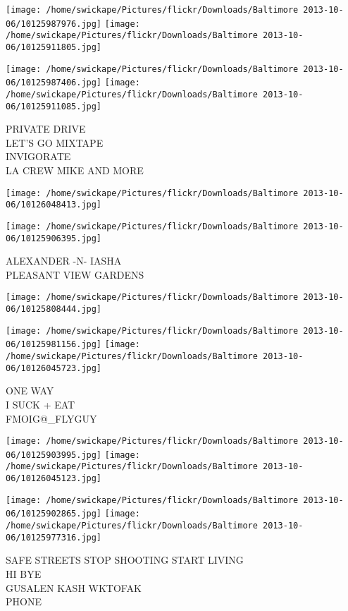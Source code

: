 \documentclass[10pt,letterpaper]{article}
\begin{document}
\texttt{[image: /home/swickape/Pictures/flickr/Downloads/Baltimore 2013-10-06/10125987976.jpg]}
\texttt{[image: /home/swickape/Pictures/flickr/Downloads/Baltimore 2013-10-06/10125911805.jpg]}

\texttt{[image: /home/swickape/Pictures/flickr/Downloads/Baltimore 2013-10-06/10125987406.jpg]}
\texttt{[image: /home/swickape/Pictures/flickr/Downloads/Baltimore 2013-10-06/10125911085.jpg]}

PRIVATE DRIVE\\
LET'S GO MIXTAPE\\
INVIGORATE\\
LA CREW MIKE AND MORE\\
\pagebreak

\texttt{[image: /home/swickape/Pictures/flickr/Downloads/Baltimore 2013-10-06/10126048413.jpg]}

\vspace{0.25in}
\texttt{[image: /home/swickape/Pictures/flickr/Downloads/Baltimore 2013-10-06/10125906395.jpg]}

ALEXANDER {-}N{-} IASHA\\
PLEASANT VIEW GARDENS\\
\pagebreak

\texttt{[image: /home/swickape/Pictures/flickr/Downloads/Baltimore 2013-10-06/10125808444.jpg]}

\vspace{0.25in}
\texttt{[image: /home/swickape/Pictures/flickr/Downloads/Baltimore 2013-10-06/10125981156.jpg]}
\texttt{[image: /home/swickape/Pictures/flickr/Downloads/Baltimore 2013-10-06/10126045723.jpg]}

ONE WAY\\
I SUCK + EAT\\
FMOIG@\_FLYGUY\\
\pagebreak

\texttt{[image: /home/swickape/Pictures/flickr/Downloads/Baltimore 2013-10-06/10125903995.jpg]}
\texttt{[image: /home/swickape/Pictures/flickr/Downloads/Baltimore 2013-10-06/10126045123.jpg]}

\texttt{[image: /home/swickape/Pictures/flickr/Downloads/Baltimore 2013-10-06/10125902865.jpg]}
\texttt{[image: /home/swickape/Pictures/flickr/Downloads/Baltimore 2013-10-06/10125977316.jpg]}

SAFE STREETS STOP SHOOTING START LIVING\\
HI BYE\\
GUSALEN KASH WKTOFAK\\
PHONE\\
\pagebreak
\end{document}
